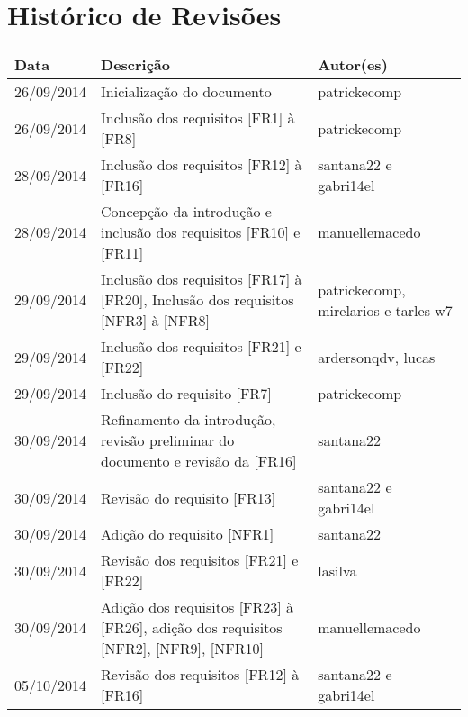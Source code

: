 \documentclass{article}
\begin{document}
\capa

\newpage
	
	\section*{\center Histórico de Revisões}
	  \vspace*{1cm}
	  \begin{table}[ht]
	    \centering
	    \begin{tabular}[pos]{|m{2cm} | m{7.2cm} | m{3.8cm}|} 
	      \hline
	      \cellcolor[gray]{0.9}
	      \textbf{Data} & \cellcolor[gray]{0.9}\textbf{Descrição} & \cellcolor[gray]{0.9}\textbf{Autor(es)}\\ \hline
	      \hline
	      \small 26/09/2014 & \small Inicialização do documento & \small patrickecomp \\ \hline      
	      \small 26/09/2014 & \small Inclusão dos requisitos [FR1] à [FR8] & \small patrickecomp \\ \hline 
	      \small 28/09/2014 & \small Inclusão dos requisitos [FR12] à [FR16] & \small santana22 e gabri14el \\ \hline
	      \small 28/09/2014 & \small Concepção da introdução e inclusão dos requisitos [FR10] e [FR11] & \small manuellemacedo \\ \hline 
	      \small 29/09/2014 & \small Inclusão dos requisitos [FR17] à [FR20], Inclusão dos requisitos [NFR3] à [NFR8] & \small patrickecomp, mirelarios e tarles-w7 \\ \hline    
	      \small 29/09/2014 & \small Inclusão dos requisitos [FR21] e [FR22] & \small ardersonqdv, lucas \\ \hline   
	      \small 29/09/2014 & \small Inclusão do requisito [FR7] & \small patrickecomp \\ \hline 
	      \small 30/09/2014 & \small Refinamento da introdução,  revisão preliminar do documento e revisão da [FR16] & \small santana22 \\ \hline
	      \small 30/09/2014 & \small Revisão do requisito [FR13] & \small santana22 e gabri14el \\ \hline
	      \small 30/09/2014 & \small Adição do requisito [NFR1] & \small santana22 \\ \hline
	      \small 30/09/2014 & \small Revisão dos requisitos [FR21] e [FR22] & \small lasilva\\ \hline
	      \small 30/09/2014 & \small Adição dos requisitos [FR23] à [FR26], adição dos requisitos [NFR2], [NFR9], [NFR10]  & \small manuellemacedo \\ \hline
	      \small 05/10/2014 & \small Revisão dos requisitos [FR12] à [FR16] & \small santana22 e gabri14el \\ \hline
          

\end{tabular}
\end{table}
\end{document}
